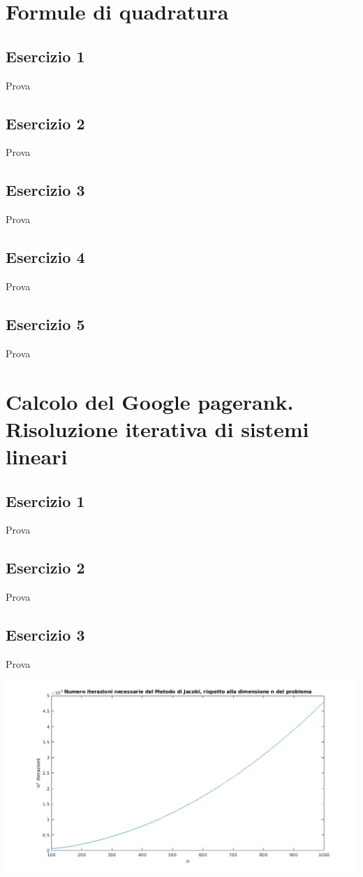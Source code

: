 \documentclass[10pt,a4paper]{report}
\begin{document}
	\chapter{Formule di quadratura}
		\section{Esercizio 1}
			Prova
			
		\section{Esercizio 2}
			Prova
			
		\section{Esercizio 3}
			Prova
			
		\section{Esercizio 4}
			Prova
			
		\section{Esercizio 5}
			Prova
			
	\chapter{Calcolo del Google pagerank. Risoluzione iterativa di sistemi lineari}
		\section{Esercizio 1}
			Prova
			
		\section{Esercizio 2}
			Prova
			
		\section{Esercizio 3}
			Prova
			
			\includegraphics[width=\textwidth]{Grafici/Cap6/es3_jacobi.png}
\end{document}

